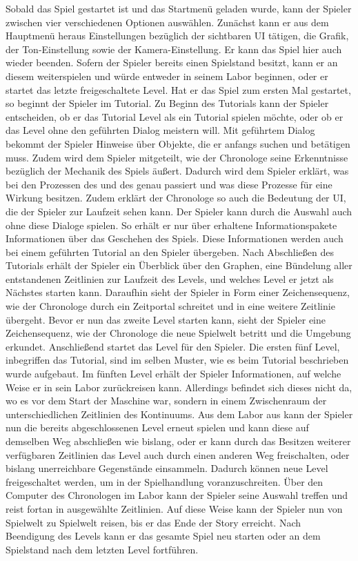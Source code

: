 Sobald das Spiel gestartet ist und das Startmenü geladen wurde, kann der Spieler zwischen vier verschiedenen Optionen auswählen. Zunächst kann er aus dem Hauptmenü heraus Einstellungen bezüglich der sichtbaren \ac{UI} tätigen, die Grafik, der Ton-Einstellung sowie der Kamera-Einstellung. Er kann das Spiel hier auch wieder beenden. Sofern der Spieler bereits einen Spielstand besitzt, kann er an diesem weiterspielen und würde entweder in seinem Labor beginnen, oder er startet das letzte freigeschaltete Level. Hat er das Spiel zum ersten Mal gestartet, so beginnt der Spieler im Tutorial. Zu Beginn des Tutorials kann der Spieler entscheiden, ob er das Tutorial Level als ein Tutorial spielen möchte, oder ob er das Level ohne den geführten Dialog meistern will. Mit geführtem Dialog bekommt der Spieler Hinweise über Objekte, die er anfangs suchen und betätigen muss. Zudem wird dem Spieler mitgeteilt, wie der Chronologe seine Erkenntnisse bezüglich der Mechanik des Spiels äußert. Dadurch wird dem Spieler erklärt, was bei den Prozessen des  und des  genau passiert und was diese Prozesse für eine Wirkung besitzen. Zudem erklärt der Chronologe so auch die Bedeutung der \ac{UI}, die der Spieler zur Laufzeit sehen kann. Der Spieler kann durch die Auswahl auch ohne diese Dialoge spielen. So erhält er nur über erhaltene Informationspakete Informationen über das Geschehen des Spiels. Diese Informationen werden auch bei einem geführten Tutorial an den Spieler übergeben.
Nach Abschließen des Tutorials erhält der Spieler ein Überblick über den Graphen, eine Bündelung aller entstandenen Zeitlinien zur Laufzeit des Levels, und welches Level er jetzt als Nächstes starten kann. Daraufhin sieht der Spieler in Form einer Zeichensequenz, wie der Chronologe durch ein Zeitportal schreitet und in eine weitere Zeitlinie übergeht. Bevor er nun das zweite Level starten kann, sieht der Spieler eine Zeichensequenz, wie der Chronologe die neue Spielwelt betritt und die Umgebung erkundet. Anschließend startet das Level für den Spieler. Die ersten fünf Level, inbegriffen das Tutorial, sind im selben Muster, wie es beim Tutorial beschrieben wurde aufgebaut. Im fünften Level erhält der Spieler Informationen, auf welche Weise er in sein Labor zurückreisen kann. Allerdings befindet sich dieses nicht da, wo es vor dem Start der Maschine war, sondern in einem Zwischenraum der unterschiedlichen Zeitlinien des Kontinuums. Aus dem Labor aus kann der Spieler nun die bereits abgeschlossenen Level erneut spielen und kann diese auf demselben Weg abschließen wie bislang, oder er kann durch das Besitzen weiterer verfügbaren Zeitlinien das Level auch durch einen anderen Weg freischalten, oder bislang unerreichbare Gegenstände einsammeln. Dadurch können neue Level freigeschaltet werden, um in der Spielhandlung voranzuschreiten. Über den Computer des Chronologen im Labor kann der Spieler seine Auswahl treffen und reist fortan in ausgewählte Zeitlinien. Auf diese Weise kann der Spieler nun von Spielwelt zu Spielwelt reisen, bis er das Ende der Story erreicht. Nach Beendigung des Levels kann er das gesamte Spiel neu starten oder an dem Spielstand nach dem letzten Level fortführen.


